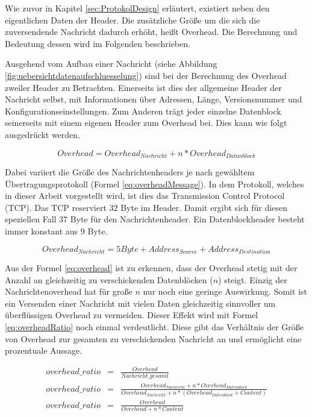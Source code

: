 Wie zuvor in Kapitel \ref{sec:ProtokolDesign} erläutert, existiert neben den
eigentlichen Daten der Header. Die zusätzliche Größe um die sich die
zuversendende Nachricht dadurch erhöht, heißt Overhead. Die Berechnung und
Bedeutung dessen wird im Folgenden beschrieben.

Ausgehend vom Aufbau einer Nachricht (siehe Abbildung
\ref{fig:uebersichtdatenaufschluesselung}) sind bei der Berechnung des Overhead
zweiler Header zu Betrachten. Einerseits ist dies der allgemeine Header der
Nachricht selbst, mit Informationen über Adressen, Länge, Versionsnummer und
Konfigurationseinstellungen. Zum Anderen trägt jeder einzelne Datenblock
seinerseits mit einem eigenen Header zum Overhead bei. Dies kann wie folgt
ausgedrückt werden.

\begin{equation}
	Overhead = Overhead_{Nachricht} + n * Overhead_{Datanblock}
	\label{eq:overhead}
\end{equation}

Dabei variiert die Größe des Nachrichtenheaders je nach gewähltem
Übertragungsprotokoll (Formel \ref{eq:overheadMessage}). In dem Protokoll,
welches in dieser Arbeit vorgestellt wird, ist dies das Transmission Control
Protocol (TCP). Das TCP reserviert $32$ Byte im Header. Damit ergibt sich für
diesen speziellen Fall $37$ Byte für den Nachrichtenheader. Ein Datenblockheader
besteht immer konstant aus $9$ Byte.

\begin{equation}
	Overhead_{Nachricht} = 5 Byte + Address_{Source} + Address_{Destination}
	\label{eq:overheadMessage}
\end{equation}

Aus der Formel \ref{eq:overhead} ist zu erkennen, dass der Overhead
stetig mit der Anzahl an gleichzeitig zu verschickenden Datenblöcken ($n$)
steigt. Einzig der Nachrichtenoverhead hat für große $n$ nur noch eine
geringe Auswirkung. Somit ist ein Versenden einer Nachricht mit vielen Daten
gleichzeitig sinnvoller um überflüssigen Overhead zu vermeiden. Dieser
Effekt wird mit Formel \ref{eq:overheadRatio} noch einmal verdeutlicht. Diese
gibt das Verhältnis der Größe von Overhead zur gesamten zu verschickenden
Nachricht an und ermöglicht eine prozentuale Aussage.

\begin{eqnarray} 
	overhead\_ratio & = & \frac{Overhead}{Nachricht\_gesamt}\\
	overhead\_ratio & = & \frac{Overhead_{Nachricht} + n * Overhead_{Datenblock}}{Overhead_{Nachricht} + n * (Overhead_{Datenblock} + Content)}\\
	overhead\_ratio & = & \frac{Overhead}{Overhead + n * Content}
	\label{eq:overheadRatio}
\end{eqnarray}